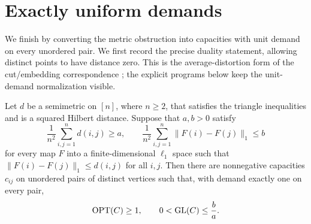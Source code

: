 \section{Exactly uniform demands}
\label{sec:reduction}

We finish by converting the metric obstruction into capacities with unit
demand on every unordered pair.  We first record the precise duality
statement, allowing distinct points to have distance zero. This is the
average-distortion form of the cut/embedding correspondence
\cite[Section~4]{LLR95}\cite[Section~1.3]{Rab08}; the explicit programs
below keep the unit-demand normalization visible.

\begin{lemma}
\label{lem:duality}
Let $d$ be a semimetric on $[n]$, where $n\geq 2$, that satisfies the
triangle inequalities and is a squared Hilbert distance.  Suppose that
$a,b>0$ satisfy
\begin{equation}
\label{red:averages}
\frac{1}{n^2}\sum_{i,j=1}^n d(i,j)\geq a,
\qquad
\frac{1}{n^2}\sum_{i,j=1}^n
\|F(i)-F(j)\|_1\leq b
\end{equation}
for every map $F$ into a finite-dimensional $\ell_1$ space such that
$\|F(i)-F(j)\|_1\leq d(i,j)$ for all $i,j$.
Then there are nonnegative capacities $c_{ij}$ on unordered pairs of
distinct vertices such that, with demand exactly one on every pair,
\begin{equation}
\label{red:gap-lemma}
\operatorname{OPT}(C)\geq 1,
\qquad
0<\operatorname{GL}(C)\leq \frac{b}{a}.
\end{equation}
\end{lemma}

